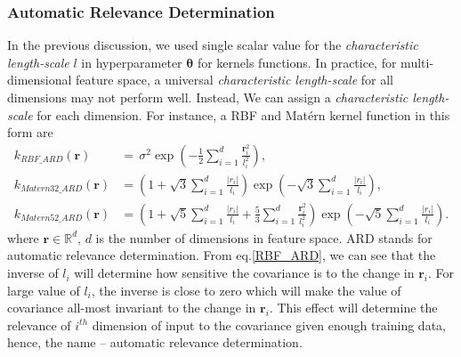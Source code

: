 \documentclass[11pt,a4paper]{article}
\theoremstyle{definition}
\numberwithin{equation}{section}
\let\vec\mathbf
\begin{document}
	\subsubsection{Automatic Relevance Determination}
	In the previous discussion, we used single scalar value for the \textit{characteristic length-scale} $l$ in hyperparameter $\vec \theta$ for kernels functions. In practice, for multi-dimensional feature space, a universal \textit{characteristic length-scale} for all dimensions may not perform well. Instead, We can assign a \textit{characteristic length-scale} for each dimension. For instance, a RBF and Mat\'ern kernel function in this form are
	\begin{equation}\label{RBF_ARD}
	\begin{split}
	k_{RBF\_ARD}(\vec r)\, &= \, \sigma^2\exp\left(-\frac{1}{2}\sum_{i=1}^{d}\frac{\vec r^2_i}{ l^2_i}\right),\\
	k_{Matern32\_ARD}(\vec r) &=\left(1+\sqrt{3}\sum_{i=1}^{d}\frac{\vec |r_i|}{l_i}\right)\exp\left(-\sqrt{3}\sum_{i=1}^{d}\frac{\vec |r_i|}{l_i}\right),\\
	k_{Matern52\_ARD}(\vec r) &=\left(1+\sqrt{5}\sum_{i=1}^{d}\frac{\vec |r_i|}{l_i}+\frac{5}{3}\sum_{i=1}^{d}\frac{\vec r^2_i}{ l^2_i}\right)\exp\left(-\sqrt{5}\sum_{i=1}^{d}\frac{\vec |r_i|}{l_i}\right).
	\end{split}
	\end{equation}
	where $\vec r \in \mathbb R^d$, $d$ is the number of dimensions in feature space. ARD stands for automatic relevance determination\cite[Neal]{Neal}. 
	From eq.\ref{RBF_ARD}, we can see that the inverse of $l_i$ will determine how sensitive the covariance is to the change in $\vec r_i$. For large value of $l_i$, the inverse is close to zero which will make the value of covariance all-most invariant to the change in $\vec r_i$. This effect will determine the relevance of $i^{th}$ dimension of input to the covariance given enough training data, hence, the name -- automatic relevance determination.
	
\end{document}
